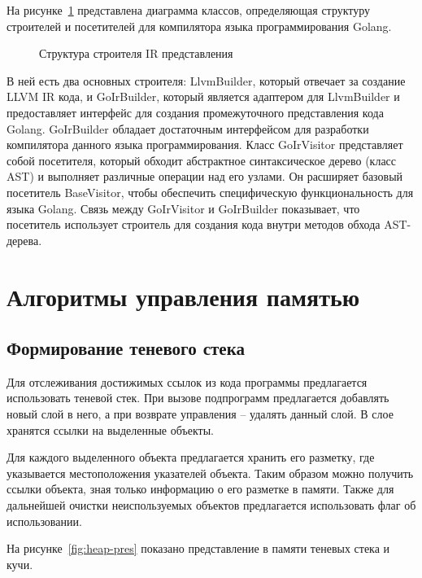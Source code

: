 На рисунке~\ref{fig:builder-ir} представлена диаграмма классов, определяющая структуру строителей и посетителей для компилятора языка программирования Golang.


\begin{figure}[h]
    \centering

    

    \caption{Структура строителя IR представления}
    \label{fig:builder-ir}
\end{figure}


В ней есть два основных строителя: LlvmBuilder, который отвечает за создание LLVM IR кода, и GoIrBuilder, который является адаптером для LlvmBuilder и предоставляет интерфейс для создания промежуточного представления кода Golang.
GoIrBuilder обладает достаточным интерфейсом для разработки компилятора данного языка программирования.
Класс GoIrVisitor представляет собой посетителя, который обходит абстрактное синтаксическое дерево (класс AST) и выполняет различные операции над его узлами.
Он расширяет базовый посетитель BaseVisitor, чтобы обеспечить специфическую функциональность для языка Golang.
Связь между GoIrVisitor и GoIrBuilder показывает, что посетитель использует строитель для создания кода внутри методов обхода AST-дерева.


\section{Алгоритмы управления памятью}

\subsection*{Формирование теневого стека}


Для отслеживания достижимых ссылок из кода программы предлагается использовать теневой стек.
При вызове подпрограмм предлагается добавлять новый слой в него, а при возврате управления -- удалять данный слой.
В слое хранятся ссылки на выделенные объекты.

Для каждого выделенного объекта предлагается хранить его разметку, где указывается местоположения указателей объекта.
Таким образом можно получить ссылки объекта, зная только информацию о его разметке в памяти.
Также для дальнейшей очистки неиспользуемых объектов предлагается использовать флаг об использовании.

На рисунке~\ref{fig:heap-pres} показано представление в памяти теневых стека и кучи.

